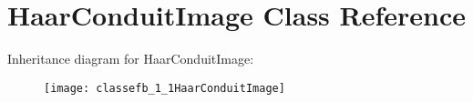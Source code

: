 \hypertarget{classefb_1_1HaarConduitImage}{
\section{HaarConduitImage Class Reference}
\label{classefb_1_1HaarConduitImage}
}
Inheritance diagram for HaarConduitImage:\begin{figure}[H]
\begin{center}
\leavevmode
\texttt{[image: classefb\_1\_1HaarConduitImage]}
\end{center}
\end{figure}
